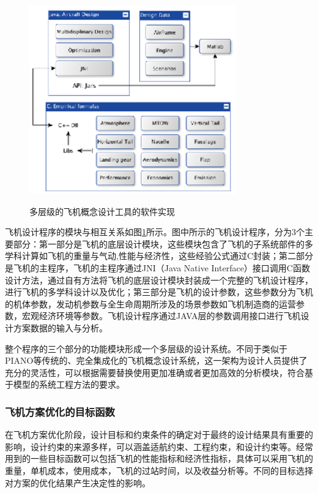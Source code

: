 \documentclass[12pt,a4paper]{report}
\begin{document}
\begin{figure}[ht!]
  \centering
  \includegraphics[width=0.8\textwidth]{tool-flowchart.eps}\\
  \caption{多层级的飞机概念设计工具的软件实现}
  \label{fig_tool}
\end{figure}

飞机设计程序的模块与相互关系如图\ref{fig_tool}所示。图中所示的飞机设计程序，分为3个主要部分：第一部分是飞机的底层设计模块，这些模块包含了飞机的子系统部件的多学科计算如飞机的重量与气动,性能与经济性，这些经验公式通过C封装；第二部分是飞机的主程序，飞机的主程序通过JNI（Java Native Interface）接口调用C函数设计方法，通过自有方法将飞机的底层设计模块封装成一个完整的飞机设计程序，进行飞机的多学科设计以及优化；第三部分是飞机的设计参数，这些参数分为飞机的机体参数，发动机参数与全生命周期所涉及的场景参数如飞机制造商的运营参数，宏观经济环境等参数。飞机设计程序通过JAVA层的参数调用接口进行飞机设计方案数据的输入与分析。

整个程序的三个部分的功能模块形成一个多层级的设计系统。不同于类似于PIANO等传统的、完全集成化的飞机概念设计系统，这一架构为设计人员提供了充分的灵活性，可以根据需要替换使用更加准确或者更加高效的分析模块，符合基于模型的系统工程方法的要求。

\subsubsection{飞机方案优化的目标函数}

在飞机方案优化阶段，设计目标和约束条件的确定对于最终的设计结果具有重要的影响，设计约束的来源多样，可以涵盖适航约束、工程约束，和设计约束等。经常用到的一些目标函数可以包括飞机的性能指标和经济性指标，具体可以采用飞机的重量，单机成本，使用成本，飞机的过站时间，以及收益分析等。不同的目标选择对方案的优化结果产生决定性的影响。
\end{document}
